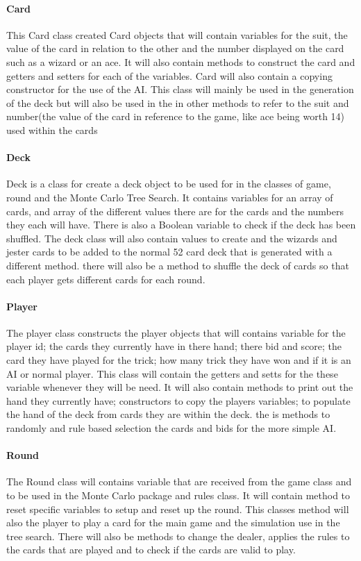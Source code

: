 \paragraph{Card}
This Card class created Card objects that will contain variables for the suit, the value of the card in relation to the other and the number displayed on the card such as a wizard or an ace. It will also contain methods to construct the card and getters and setters for each of the variables. Card will also contain a copying constructor for the use of the AI. This class will mainly be used in the generation of the deck but will also be used in the in other methods to refer to the suit and number(the value of the card in reference to the game, like ace being worth 14) used within the cards
\paragraph{Deck}
Deck is a class for create a deck object to be used for in the classes of game, round and the Monte Carlo Tree Search. It contains variables for an array of cards, and array of the different values there are for the cards and the numbers they each will have. There is also a Boolean variable to check if the deck has been shuffled. The deck class will also contain values to create and the wizards and jester cards to be added to the normal 52 card deck that is generated with a different method. there will also be a method to shuffle the deck of cards so that each player gets different cards for each round.
\paragraph{Player} 
The player class constructs the player objects that will contains variable for the player id; the cards they currently have in there hand; there bid and score; the card they have played for the trick; how many trick they have won and if it is an AI or normal player. This class will contain the getters and setts for the these variable whenever they will be need. It will also contain methods to print out the hand they currently have; constructors to copy the players variables; to populate the hand of the deck from cards they are within the deck. the is methods to randomly and rule based selection the cards and bids for the more simple AI.
\paragraph{Round}
The Round class will contains variable that are received from the game class and to be used in the Monte Carlo package and rules class. It will contain method to reset specific variables to setup and reset up the round. This classes method will also the player to play a card for the main game and the simulation use in the tree search. There will also be methods to change the dealer, applies the rules to the cards that are played and to check if the cards are valid to play.
